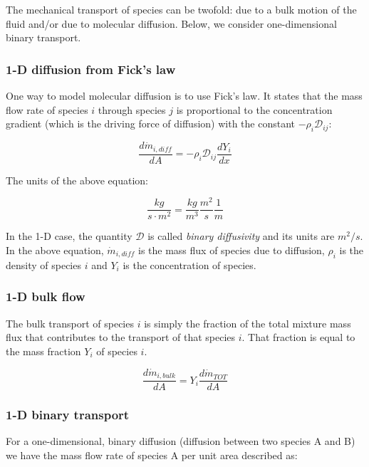\documentclass[10pt,twocolumn]{article}
\begin{document}
The mechanical transport of species can be twofold: due to a bulk motion of the fluid and/or due to molecular diffusion. Below, we consider one-dimensional binary transport.

\subsubsection{1-D diffusion from Fick's law}

One way to model molecular diffusion is to use Fick's law. It states that the mass flow rate of species $i$ through species $j$ is proportional to the concentration gradient (which is the driving force of diffusion) with the constant $-\rho_i \mathcal{D}_{ij}$:

\begin{equation}
\frac{d \dot{m}_{i, diff}}{dA} = - \rho_i \mathcal{D}_{ij} \frac{d Y_i}{dx}
\end{equation}

The units of the above equation:

\begin{equation*}
\frac{kg}{s \cdot m^2} = \frac{kg}{m^3} \frac{m^2}{s} \frac{1}{m}
\end{equation*}

In the 1-D case, the quantity $\mathcal{D}$ is called \textit{binary diffusivity} and its units are $m^2/s$. In the above equation, $\dot{m}_{i, diff}$ is the mass flux of species due to diffusion, $\rho_i$ is the density of species $i$ and $Y_i$ is the concentration of species.

\subsubsection{1-D bulk flow}

The bulk transport of species $i$ is simply the fraction of the total mixture mass flux that contributes to the transport of that species $i$. That fraction is equal to the mass fraction $Y_i$ of species $i$.

\begin{equation}
\frac{d \dot{m}_{i, bulk}}{dA} = Y_i \frac{d \dot{m}_{TOT}}{d A}
\end{equation}

\subsubsection{1-D binary transport}

For a one-dimensional, binary diffusion (diffusion between two species A and B) we have the mass flow rate of species A per unit area described as:
\end{document}

